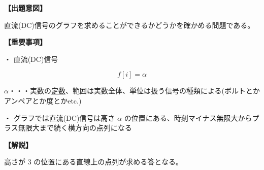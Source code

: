 \noindent \textbf{【出題意図】}

\noindent 直流(DC)信号のグラフを求めることができるかどうかを確かめる問題である。

\vspace{1em}
\noindent \textbf{【重要事項】}

\medskip
\noindent・ 直流(DC)信号

\[
f[i] = \alpha
\]

\bigskip
\noindent $\alpha$・・・実数の\underline{定数}、範囲は実数全体、単位は扱う信号の種類による(ボルトとかアンペアとか度とかetc.)

\bigskip
\noindent・ グラフでは直流(DC)信号は高さ $\alpha$ の位置にある、時刻マイナス無限大からプラス無限大まで続く横方向の点列になる

\vspace{1em}
\noindent \textbf{【解説】}

\noindent 高さが $3$ の位置にある直線上の点列が求める答となる。
